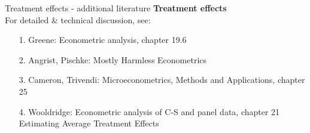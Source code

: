 \documentclass{beamer}
\begin{document}
\begin{frame}{Treatment effects - additional literature}
\textbf{Treatment effects}\\
\medskip
For detailed \& technical discussion, see:\\
\medskip
\begin{itemize}
\item[1.] Greene: Econometric analysis, chapter 19.6
\medskip
\item[2.] Angrist, Pischke: Mostly Harmless Econometrics
\medskip
\item[3.] Cameron, Trivendi: Microeconometrics, Methods and Applications, chapter 25
\medskip
\item[4.] Wooldridge: Econometric analysis of C-S and panel data, chapter 21 Estimating Average Treatment Effects
\end{itemize}
\end{frame}
\end{document}
